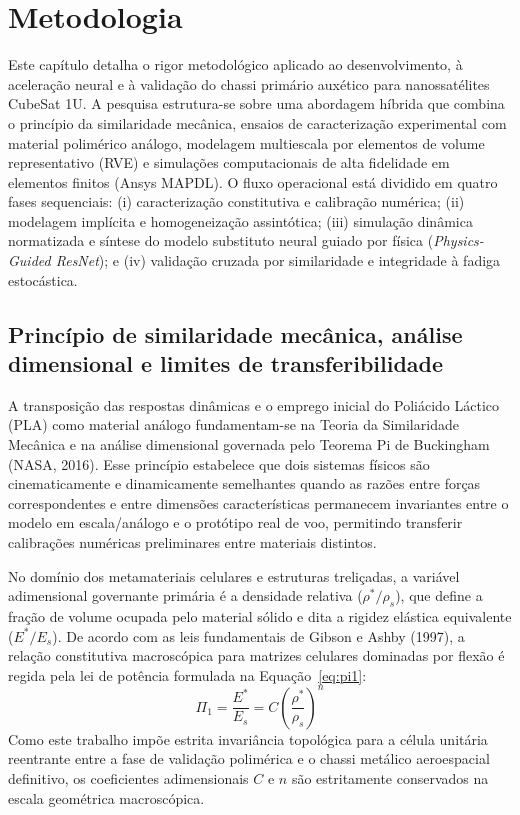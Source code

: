 \chapter{Metodologia}
\label{cap:metodologia}

Este capítulo detalha o rigor metodológico aplicado ao desenvolvimento, à aceleração neural e à validação do chassi primário auxético para nanossatélites CubeSat 1U. A pesquisa estrutura-se sobre uma abordagem híbrida que combina o princípio da similaridade mecânica, ensaios de caracterização experimental com material polimérico análogo, modelagem multiescala por elementos de volume representativo (RVE) e simulações computacionais de alta fidelidade em elementos finitos (Ansys MAPDL). O fluxo operacional está dividido em quatro fases sequenciais: (i) caracterização constitutiva e calibração numérica; (ii) modelagem implícita e homogeneização assintótica; (iii) simulação dinâmica normatizada e síntese do modelo substituto neural guiado por física (\textit{Physics-Guided ResNet}); e (iv) validação cruzada por similaridade e integridade à fadiga estocástica.

\section{Princípio de similaridade mecânica, análise dimensional e limites de transferibilidade}
\label{sec:similaridade}

A transposição das respostas dinâmicas e o emprego inicial do Poliácido Láctico (PLA) como material análogo fundamentam-se na Teoria da Similaridade Mecânica e na análise dimensional governada pelo Teorema Pi de Buckingham (NASA, 2016). Esse princípio estabelece que dois sistemas físicos são cinematicamente e dinamicamente semelhantes quando as razões entre forças correspondentes e entre dimensões características permanecem invariantes entre o modelo em escala/análogo e o protótipo real de voo, permitindo transferir calibrações numéricas preliminares entre materiais distintos.

No domínio dos metamateriais celulares e estruturas treliçadas, a variável adimensional governante primária é a densidade relativa ($\rho^{*}/\rho_s$), que define a fração de volume ocupada pelo material sólido e dita a rigidez elástica equivalente ($E^{*}/E_s$). De acordo com as leis fundamentais de Gibson e Ashby (1997), a relação constitutiva macroscópica para matrizes celulares dominadas por flexão é regida pela lei de potência formulada na Equação~\eqref{eq:pi1}:
\begin{equation}
  \Pi_1 = \frac{E^{*}}{E_s} = C \left( \frac{\rho^{*}}{\rho_s} \right)^{n}
  \label{eq:pi1}
\end{equation}
Como este trabalho impõe estrita invariância topológica para a célula unitária reentrante entre a fase de validação polimérica e o chassi metálico aeroespacial definitivo, os coeficientes adimensionais $C$ e $n$ são estritamente conservados na escala geométrica macroscópica.

